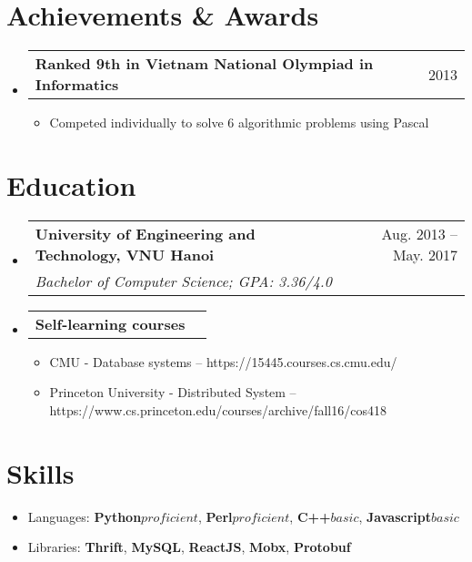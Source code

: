 \documentclass[a4paper,11pt]{article}
\makeatletter
\newcommand{\resumeItem}[1]{
  \item\small{
    {#1 \vspace{-2pt}}
  }
}
\newcommand{\resumeSubheadTwo}[2]{
  \vspace{-1pt}\item
    \begin{tabular*}{0.97\textwidth}{l@{\extracolsep{\fill}}r}
      \textbf{#1} & #2
    \end{tabular*}\vspace{-5pt}
}
\newcommand{\resumeSubhead}[3]{
  \vspace{-1pt}\item
    \begin{tabular*}{0.97\textwidth}{l@{\extracolsep{\fill}}r}
      \textbf{#1} & #2 \\
      \textit{\normalsize#3}
    \end{tabular*}\vspace{-5pt}
}
\newcommand{\resumeSubHeadingListStart}{\begin{itemize}[leftmargin=*]}
\newcommand{\resumeSubHeadingListEnd}{\end{itemize}}
\newcommand{\resumeItemListStart}{\begin{itemize}}
\newcommand{\resumeItemListEnd}{\end{itemize}\vspace{-5pt}}
\makeatother
\begin{document}
\section{Achievements \& Awards}
  \resumeSubHeadingListStart
    \resumeSubheadTwo
      {Ranked 9th in Vietnam National Olympiad in Informatics}{2013}
      \resumeItemListStart
        \resumeItem{Competed individually to solve 6 algorithmic problems using Pascal}
      \resumeItemListEnd
  \resumeSubHeadingListEnd



\section{Education}
  \resumeSubHeadingListStart
    \resumeSubhead
      {University of Engineering and Technology, VNU Hanoi}{Aug. 2013 -- May. 2017}
      {Bachelor of Computer Science;  GPA: 3.36/4.0}

    \resumeSubheadTwo
      {Self-learning courses}{}
      \resumeItemListStart
        \resumeItem{CMU - Database systems -- https://15445.courses.cs.cmu.edu/}
        \resumeItem{Princeton University - Distributed System -- https://www.cs.princeton.edu/courses/archive/fall16/cos418}
      \resumeItemListEnd
  \resumeSubHeadingListEnd

\section{Skills}
  \resumeSubHeadingListStart
    \resumeItemListStart
      \resumeItem{Languages: \textbf{Python\(proficient\)}, \textbf{Perl\(proficient\)}, \textbf{C++\(basic\)}, \textbf{Javascript\(basic\)}}
      \resumeItem{Libraries: \textbf{Thrift}, \textbf{MySQL}, \textbf{ReactJS}, \textbf{Mobx}, \textbf{Protobuf}}
    \resumeItemListEnd
  \resumeSubHeadingListEnd
\end{document}

